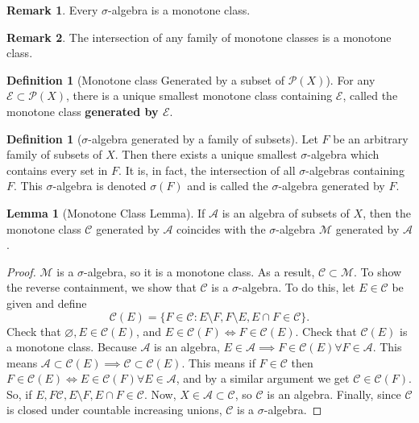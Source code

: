 \documentclass{article}
\theoremstyle{definition}
\theoremstyle{theorem}
\newtheorem{lemma}[theorem]{Lemma}
\newtheorem{definition}[theorem]{Definition}
\newtheorem{remark}{Remark}
\begin{document}
\begin{remark}
Every $\sigma$-algebra is a monotone class.
\end{remark}

\begin{remark}
The intersection of any family of monotone classes is a monotone class.
\end{remark}



\begin{definition}[Monotone class Generated by a subset of $\mathcal{P}(X)$]
For any $\mathcal{E} \subset \mathcal{P}(X)$, there is a unique smallest monotone class containing $\mathcal{E}$, called the monotone class \textbf{generated by $\mathcal{E}$}. 
\end{definition}

\begin{definition}[$\sigma$-algebra generated by a family of subsets]
Let $F$ be an arbitrary family of subsets of $X$. Then there exists a unique smallest $\sigma$-algebra which contains every set in $F$. It is, in fact, the intersection of all $\sigma$-algebras containing $F$. This $\sigma$-algebra is denoted $\sigma(F)$ and is called the $\sigma$-algebra generated by $F$.
\end{definition}



\begin{lemma}[Monotone Class Lemma]
If $\mathcal{A}$ is an algebra of subsets of $X$, then the monotone class $\mathcal{C}$ generated by $\mathcal{A}$ coincides with the $\sigma$-algebra $\mathcal{M}$ generated by $\mathcal{A}$. 
\end{lemma}

\begin{proof}
$\mathcal{M}$ is a $\sigma$-algebra, so it is a monotone class. As a result, $\mathcal{C} \subset \mathcal{M}$. To show the reverse containment, we show that $\mathcal{C}$ is a $\sigma$-algebra. To do this, let $E \in \mathcal{C}$ be given and define
\begin{equation*}
    \mathcal{C}(E) = \{ F\in \mathcal{C} : E\setminus F, F\setminus E, E\cap F \in \mathcal{C}\}.
\end{equation*}
Check that $\varnothing, E\in \mathcal{C}(E)$, and $E \in \mathcal{C}(F) \iff F \in \mathcal{C}(E)$. Check that $\mathcal{C}(E)$ is a monotone class. Because $\mathcal{A}$ is an algebra, $E \in\mathcal{A} \implies F\in \mathcal{C}(E) \forall F\in \mathcal{A}$. This means $\mathcal{A}\subset \mathcal{C}(E) \implies \mathcal{C} \subset \mathcal{C}(E)$. This means if $F\in \mathcal{C}$ then $F\in \mathcal{C}(E) \iff E \in \mathcal{C}(F) \forall E\in \mathcal{A}$, and by a similar argument we get $\mathcal{C}\in \mathcal{C}(F)$. So, if $E,F\mathcal{C}, E\setminus F, E \cap F \in \mathcal{C}$. Now, $X\in \mathcal{A} \subset \mathcal{C}$, so $\mathcal{C}$ is an algebra. Finally, since $\mathcal{C}$ is closed under countable increasing unions, $\mathcal{C}$ is a $\sigma$-algebra. 
\end{proof}
\end{document}
